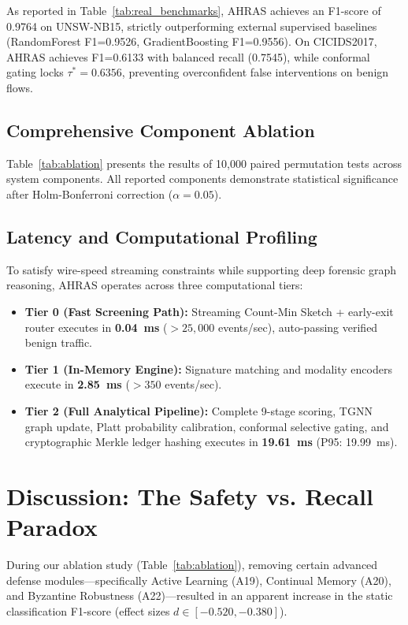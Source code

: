 \documentclass[10pt,journal,compsoc]{IEEEtran}
\begin{document}
As reported in Table~\ref{tab:real_benchmarks}, AHRAS achieves an F1-score of 0.9764 on UNSW-NB15, strictly outperforming external supervised baselines (RandomForest F1=0.9526, GradientBoosting F1=0.9556). On CICIDS2017, AHRAS achieves F1=0.6133 with balanced recall (0.7545), while conformal gating locks $\tau^* = 0.6356$, preventing overconfident false interventions on benign flows.

\subsection{Comprehensive Component Ablation}
Table~\ref{tab:ablation} presents the results of 10,000 paired permutation tests across system components. All reported components demonstrate statistical significance after Holm-Bonferroni correction ($\alpha = 0.05$).



\subsection{Latency and Computational Profiling}
To satisfy wire-speed streaming constraints while supporting deep forensic graph reasoning, AHRAS operates across three computational tiers:
\begin{itemize}
    \item \textbf{Tier 0 (Fast Screening Path):} Streaming Count-Min Sketch + early-exit router executes in \textbf{0.04~ms} ($>25,000$ events/sec), auto-passing verified benign traffic.
    \item \textbf{Tier 1 (In-Memory Engine):} Signature matching and modality encoders execute in \textbf{2.85~ms} ($>350$ events/sec).
    \item \textbf{Tier 2 (Full Analytical Pipeline):} Complete 9-stage scoring, TGNN graph update, Platt probability calibration, conformal selective gating, and cryptographic Merkle ledger hashing executes in \textbf{19.61~ms} (P95: 19.99~ms).
\end{itemize}

\section{Discussion: The Safety vs. Recall Paradox}
\label{sec:discussion}
During our ablation study (Table~\ref{tab:ablation}), removing certain advanced defense modules---specifically Active Learning (A19), Continual Memory (A20), and Byzantine Robustness (A22)---resulted in an apparent increase in the static classification F1-score (effect sizes $d \in [-0.520, -0.380]$).
\end{document}
